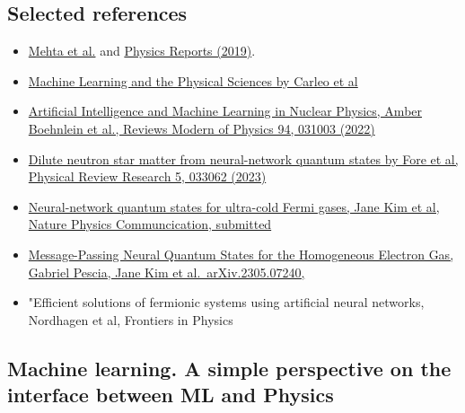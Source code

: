 \documentclass[%
oneside,                 %
final,                   %
10pt]{article}
\begin{document}
\subsection{Selected references}
\begin{block}{}
\begin{itemize}
\item \href{{https://arxiv.org/abs/1803.08823}}{Mehta et al.} and \href{{https://www.sciencedirect.com/science/article/pii/S0370157319300766?via%3Dihub}}{Physics Reports (2019)}.

\item \href{{https://link.aps.org/doi/10.1103/RevModPhys.91.045002}}{Machine Learning and the Physical Sciences by Carleo et al}

\item \href{{https://journals.aps.org/rmp/abstract/10.1103/RevModPhys.94.031003}}{Artificial Intelligence and Machine Learning in Nuclear Physics, Amber Boehnlein et al., Reviews Modern of Physics 94, 031003 (2022)} 

\item \href{{https://journals.aps.org/prresearch/pdf/10.1103/PhysRevResearch.5.033062}}{Dilute neutron star matter from neural-network quantum states by Fore et al, Physical Review Research 5, 033062 (2023)}

\item \href{{https://doi.org/10.48550/arXiv.2305.08831}}{Neural-network quantum states for ultra-cold Fermi gases, Jane Kim et al, Nature Physics Communcication, submitted}

\item \href{{https://doi.org/10.48550/arXiv.2305.07240}}{Message-Passing Neural Quantum States for the Homogeneous Electron Gas, Gabriel Pescia, Jane Kim et al.~arXiv.2305.07240,}

\item "Efficient solutions of fermionic systems using artificial neural networks, Nordhagen et al, Frontiers in Physics
\end{itemize}

\noindent
\end{block}

\subsection{Machine learning. A simple perspective on the interface between ML and Physics}

\vspace{6mm}
\end{document}
